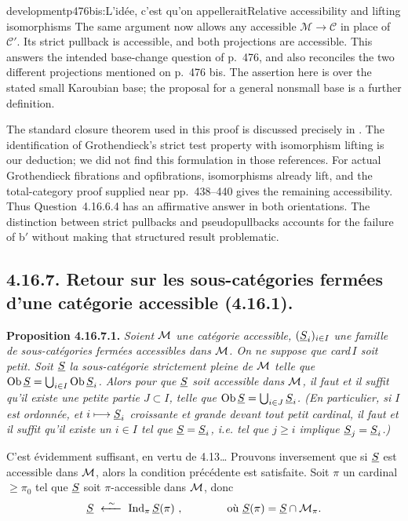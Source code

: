 \begin{dcomment}{development}{p476bis:L'idée, c'est qu'on appellerait}{Relative accessibility and lifting isomorphisms}
The same argument now allows any accessible $\mathcal M\to\mathcal C$ in place of $\mathcal C'$. Its strict pullback is accessible, and both projections are accessible. This answers the intended base-change question of p.~476, and also reconciles the two different projections mentioned on p.~476 bis. The assertion here is over the stated small Karoubian base; the proposal for a general nonsmall base is a further definition.

The standard closure theorem used in this proof is discussed precisely in \citet[Examples~4.8 and Remark~4.9]{BourkeLack2024}. The identification of Grothendieck's strict test property with isomorphism lifting is our deduction; we did not find this formulation in those references. For actual Grothendieck fibrations and opfibrations, isomorphisms already lift, and the total-category proof supplied near pp.~438--440 gives the remaining accessibility. Thus Question~4.16.6.4 has an affirmative answer in both orientations. The distinction between strict pullbacks and pseudopullbacks accounts for the failure of b$'$ without making that structured result problematic.
\end{dcomment}


\subsection*{4.16.7. Retour sur les sous-catégories fermées d'une catégorie accessible (4.16.1).}

\textbf{Proposition 4.16.7.1.} \textit{Soient $\mathcal{M}$ une catégorie accessible, $(\underline{S}_i)_{i\in I}$ une famille de sous-catégories fermées accessibles dans $\mathcal{M}$. On ne suppose que \textup{card}\,$I$ soit petit. Soit $\underline{S}$ la sous-catégorie strictement pleine de $\mathcal{M}$ telle que $\operatorname{Ob} \underline{S} = \bigcup_{i\in I} \operatorname{Ob} \underline{S}_i$. Alors pour que $\underline{S}$ %
soit accessible dans $\mathcal{M}$, il faut et il suffit qu'il existe une \textup{petite} partie $J \subset I$, telle que $\operatorname{Ob} \underline{S} = \bigcup_{i\in J} \underline{S}_i$. (En particulier, si $I$ est ordonnée, et $i \longmapsto \underline{S}_i$ croissante et grande devant tout petit cardinal, il faut et il suffit qu'il existe un $i \in I$ tel que $\underline{S} = \underline{S}_i$, i.e. tel que $j \geqslant i$ implique $\underline{S}_j = \underline{S}_i$.)}

C'est évidemment suffisant, en vertu de 4.13\dots{} Prouvons inversement que si $\underline{S}$ est accessible dans $\mathcal{M}$, alors la condition précédente est satisfaite. Soit $\pi$ un cardinal $\geqslant \pi_0$ tel que $\underline{S}$ soit $\pi$-accessible dans $\mathcal{M}$, donc
\[
\uS \ \xleftarrow{\ \sim\ }\ \Ind_\pi \uS(\pi) \ , \qquad\qquad \text{où } \uS(\pi) = \uS \cap \cM_\pi.
\]

